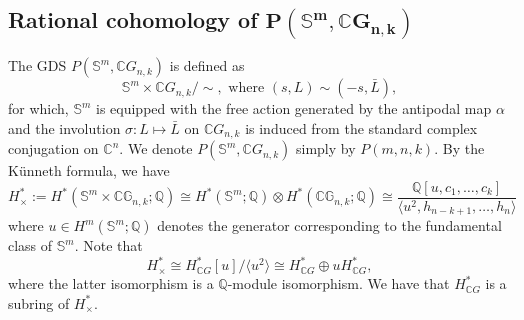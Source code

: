 \documentclass{amsart}
\begin{document}
	
	
	
	
	
	\subsection{Rational cohomology of $\mathbf{P(\mathbb S^m,\mathbb CG_{n,k})}$} \label{gds}
	
	
	The GDS $P(\mathbb S^m,\mathbb CG_{n,k})$ is defined as
	\[
	\mathbb S^m\times \mathbb CG_{n,k}/\!\!\sim, \text { where } (s,L)\sim (-s,\bar L),
	\]
for which, $\mathbb S^m$ %
is equipped with the free action generated by the antipodal %
map $\alpha$ and %
the involution $\sigma: L \mapsto \bar L$ on $\mathbb CG_{n,k}$ is induced from the standard complex conjugation on $\mathbb C^n.$ We denote $P(\mathbb S^m,\mathbb CG_{n,k})$ simply by $P(m,n,k).$
	By the K\"unneth formula, we %
have
	\begin{equation}\label{Cohomology of H_times}
		H_{\times}^* := H^*(\mathbb{S}^m \times \mathbb{CG}_{n,k}; \mathbb{Q}) \cong H^*(\mathbb{S}^m; \mathbb{Q}) \otimes H^*(\mathbb{CG}_{n,k}; \mathbb{Q}) \cong \frac{\mathbb{Q}[u, c_1, \dots, c_k]}{\langle u^2, h_{n-k+1}, \dots, h_n \rangle}
	\end{equation}
	where %
$u \in H^m(\mathbb S^m; \mathbb Q)$ denotes the generator corresponding to the fundamental class of $\mathbb S^m$. Note that \begin{equation}\label{H in terms of u}
		H^*_{\times} \cong H^*_{\mathbb{C}G}[u]/\langle u^2 \rangle \cong H^*_{\mathbb{C}G} \oplus u H^*_{\mathbb{C}G},
	\end{equation} where the latter isomorphism is a $\mathbb Q$-module isomorphism. We have that $H^*_{\mathbb{C}G}$ is a subring of $H^*_\times$.
\end{document}

